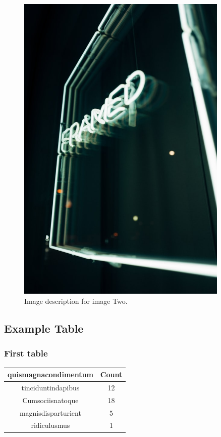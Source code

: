 \documentclass[
    a4paper,
    doc,
    11pt,
]{apa6}
\begin{document}
\begin{appendices}
    \newpage
    \begin{figure}[h!]
        \centering
        \label{append:pic:two}
        \includegraphics[width=0.9\textwidth]{appendix/imageExample/pTwo.jpg}
        \caption{Image description for image Two.}
    \end{figure}
\endgroup

\newpage
\begingroup
\subsection{Example Table}
    \subsubsection{First table}
    \label{append:example_table}
    \begin{center}
        \begin{tabular}{ |c|c| }
            \hline
            quismagnacondimentum & Count \\
            \hline
            tinciduntindapibus & 12 \\ 
            Cumsociisnatoque & 18 \\ 
            magnisdisparturient & 5 \\ 
            ridiculusmus & 1 \\ 
            \hline
        \end{tabular}
    \end{center}
\endgroup


\end{appendices}
\end{document}
